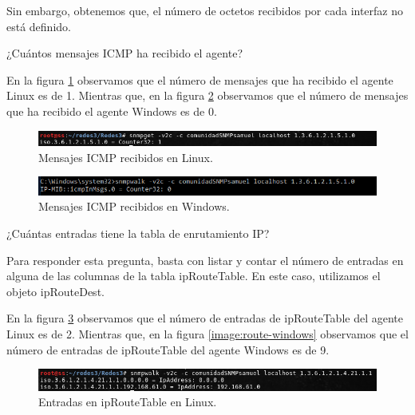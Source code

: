 Sin embargo, obtenemos que, el número de octetos recibidos por cada interfaz no está definido.

\item ¿Cuántos mensajes ICMP ha recibido el agente?

En la figura \ref{image:icmp-linux} observamos que el número de mensajes que ha recibido el agente Linux es de 1. Mientras que, en la figura \ref{image:icmp-windows} observamos que el número de mensajes que ha recibido el agente Windows es de 0.

\FloatBarrier
\begin{figure}[htbp!]
		\centering
			\includegraphics[width=.9 \textwidth]{images/8-linux}
		\caption{Mensajes ICMP recibidos en Linux.}
		\label{image:icmp-linux}
\end{figure}
\FloatBarrier

\FloatBarrier
\begin{figure}[htbp!]
		\centering
			\includegraphics[width=.9 \textwidth]{images/8-windows}
		\caption{Mensajes ICMP recibidos en Windows.}
		\label{image:icmp-windows}
\end{figure}
\FloatBarrier

\item ¿Cuántas entradas tiene la tabla de enrutamiento IP?

Para responder esta pregunta, basta con listar y contar el número de entradas en alguna de las columnas de la tabla ipRouteTable. En este caso, utilizamos el objeto ipRouteDest.

En la figura \ref{image:route-linux} observamos que el número de entradas de ipRouteTable del agente Linux es de 2. Mientras que, en la figura \ref{image:route-windows} observamos que el número de entradas de ipRouteTable del agente Windows es de 9.

\FloatBarrier
\begin{figure}[htbp!]
		\centering
			\includegraphics[width=.9 \textwidth]{images/9-linux}
		\caption{Entradas en ipRouteTable en Linux.}
		\label{image:route-linux}
\end{figure}
\FloatBarrier

